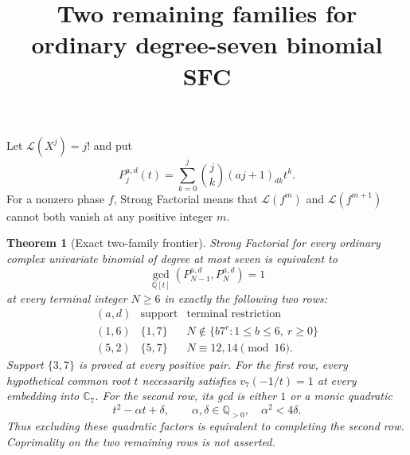 \documentclass[11pt]{article}
\newtheorem{theorem}{Theorem}
\begin{document}
\setlength{\emergencystretch}{1em}
\title{Two remaining families for ordinary degree-seven binomial SFC}
\author{}\date{}\maketitle
Let $\mathcal L(X^j)=j!$ and put
\[
 P_j^{a,d}(t)=\sum_{k=0}^j\binom jk(aj+1)_{dk}t^k.
\]
For a nonzero phase $f$, Strong Factorial means that
$\mathcal L(f^m)$ and $\mathcal L(f^{m+1})$ cannot both vanish
at any positive integer $m$.

\begin{theorem}[Exact two-family frontier]\label{thm:two-family-frontier}
Strong Factorial for every ordinary complex univariate binomial
of degree at most seven is equivalent to
\[
 \gcd_{\mathbb Q[t]}(P_{N-1}^{a,d},P_N^{a,d})=1
\]
at every terminal integer $N\ge6$ in exactly the following two rows:
\[
 \begin{array}{c|c|l}
 (a,d)&\text{support}&\text{terminal restriction}\\ \hline
 (1,6)&\{1,7\}&N\notin\{b7^r:1\le b\le6,\ r\ge0\}\\
 (5,2)&\{5,7\}&N\equiv12,14\pmod{16}.
 \end{array}
\]
Support $\{3,7\}$ is proved at every positive pair.
For the first row, every hypothetical common root $t$ necessarily
satisfies $v_7(-1/t)=1$ at every embedding into $\mathbb C_7$.
For the second row, its gcd is either $1$ or a monic quadratic
\[
 t^2-\alpha t+\delta,\qquad
 \alpha,\delta\in\mathbb Q_{>0},\quad \alpha^2<4\delta.
\]
Thus excluding these quadratic factors is equivalent to completing
the second row. Coprimality on the two remaining rows is not asserted.
\end{theorem}
\end{document}
